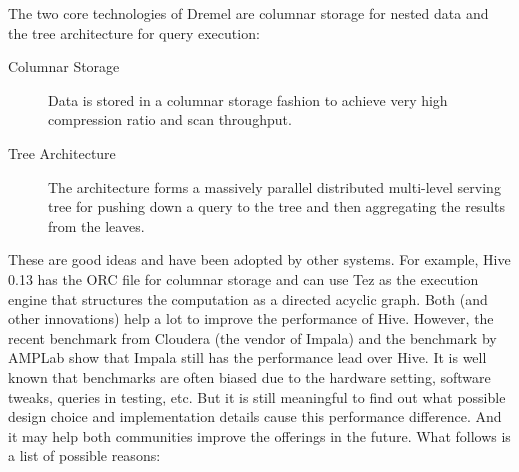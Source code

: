 \documentclass[11pt]{book}
\begin{document}
The two core technologies of Dremel are columnar storage for nested data and the tree architecture for query execution:
\begin{description}
\item[Columnar Storage]
Data is stored in a columnar storage fashion to achieve very high compression ratio and scan throughput.
\item[Tree Architecture]
The architecture forms a massively parallel distributed multi-level serving tree for pushing down a query to the tree and then aggregating the results from the leaves.
\end{description}
These are good ideas and have been adopted by other systems. For example, Hive 0.13 has the ORC file for columnar storage and can use Tez as the execution engine that structures the computation as a directed acyclic graph. Both (and other innovations) help a lot to improve the performance of Hive. However, the recent benchmark from Cloudera (the vendor of Impala) \cite{ClouderaImpala2014} and the benchmark by AMPLab \cite{AMPLabBenchmark2014} show that Impala still has the performance lead over Hive. It is well known that benchmarks are often biased due to the hardware setting, software tweaks, queries in testing, etc. But it is still meaningful to find out what possible design choice and implementation details cause this performance difference. And it may help both communities improve the offerings in the future. What follows is a list of possible reasons:
\end{document}
